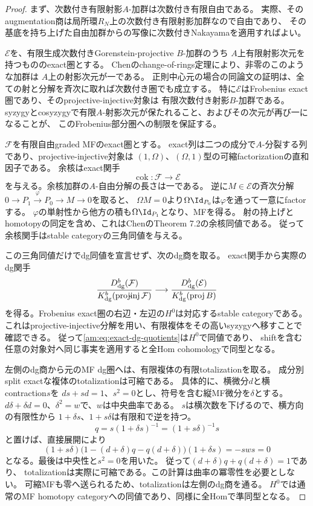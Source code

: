 \begin{proof}
まず、次数付き有限射影$A$-加群は次数付き有限自由である。
実際、そのaugmentation商は局所環$R_N$上の次数付き有限射影加群なので自由であり、
その基底を持ち上げた自由加群からの写像に次数付きNakayamaを適用すればよい。

$\mathcal E$を、有限生成次数付きGorenstein-projective $B$-加群のうち
$A$上有限射影次元を持つもののexact圏とする。
Chenのchange-of-rings定理により、非零のこのような加群は
$A$上の射影次元が一である。
正則中心元の場合の同論文の証明は、全ての射と分解を斉次に取れば次数付き圏でも成立する。
特に$\mathcal E$はFrobenius exact圏であり、そのprojective-injective対象は
有限次数付き射影$B$-加群である。
syzygyとcosyzygyで有限$A$-射影次元が保たれること、およびその次元が再び一になることが、
このFrobenius部分圏への制限を保証する。

$\mathcal F$を有限自由graded MFのexact圏とする。
exact列は二つの成分で$A$-分裂する列であり、projective-injective対象は
$(1,\Omega)$、$(\Omega,1)$型の可縮factorizationの直和因子である。
余核はexact関手
\[
 \operatorname{cok}:\mathcal F\longrightarrow\mathcal E
\]
を与える。余核加群の$A$-自由分解の長さは一である。
逆に$M\in\mathcal E$の斉次分解
$0\to P_1\xrightarrow{\varphi}P_0\to M\to0$を取ると、
$\Omega M=0$より$\Omega\Id_{P_0}$は$\varphi$を通って一意にfactorする。
$\varphi$の単射性から他方の積も$\Omega\Id_{P_1}$となり、MFを得る。
射の持上げとhomotopyの同定を含め、これはChenのTheorem 7.2の余核同値である。
従って余核関手はstable categoryの三角同値を与える。

この三角同値だけでdg同値を宣言せず、次のdg商を取る。
exact関手から実際のdg関手
\begin{equation}\label{am:eq:exact-dg-quotients}
 \frac{D^b_{\rm dg}(\mathcal F)}{K^b_{\rm dg}(\operatorname{proj\!-\!inj}\mathcal F)}
 \longrightarrow
 \frac{D^b_{\rm dg}(\mathcal E)}{K^b_{\rm dg}(\operatorname{proj}B)}
\end{equation}
を得る。Frobenius exact圏の右辺・左辺の$H^0$は対応するstable categoryである。
これはprojective-injective分解を用い、有限複体をその高いsyzygyへ移すことで確認できる。
従って\eqref{am:eq:exact-dg-quotients}は$H^0$で同値であり、
shiftを含む任意の対象対へ同じ事実を適用すると全Hom cohomologyで同型となる。

左側のdg商から元のMF dg圏へは、有限複体の有限totalizationを取る。
成分別split exactな複体のtotalizationは可縮である。
具体的に、横微分$d$と横contraction$s$を
$ds+sd=1$、$s^2=0$とし、符号を含む縦MF微分を$\delta$とする。
$d\delta+\delta d=0$、$\delta^2=w$で、$w$は中央曲率である。
$s$は横次数を下げるので、横方向の有限性から
$1+\delta s$、$1+s\delta$は有限和で逆を持つ。
\[
 q=s(1+\delta s)^{-1}=(1+s\delta)^{-1}s
\]
と置けば、直接展開により
\[
 (1+s\delta)\bigl(1-(d+\delta)q-q(d+\delta)\bigr)
 (1+\delta s)=-sws=0
\]
となる。最後は中央性と$s^2=0$を用いた。
従って$(d+\delta)q+q(d+\delta)=1$であり、
totalizationは実際に可縮である。この計算は曲率の冪零性を必要としない。
可縮MFも零へ送られるため、totalizationは左側のdg商を通る。
$H^0$では通常のMF homotopy categoryへの同値であり、同様に全Homで準同型となる。


\end{proof}
